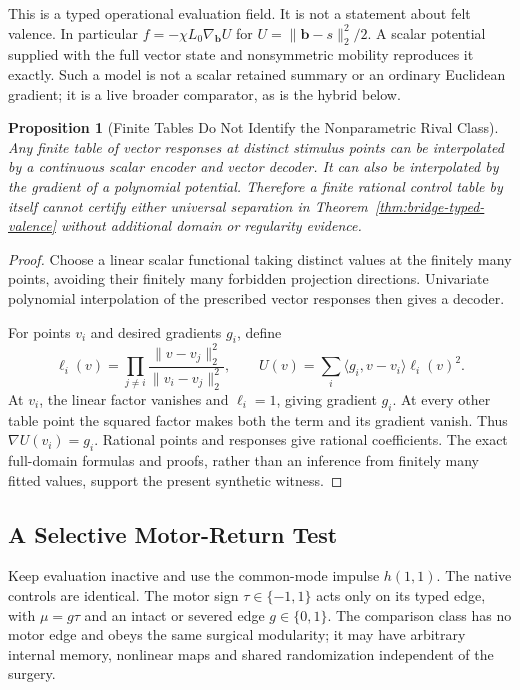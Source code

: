 \documentclass[11pt,a4paper]{article}
\newtheorem{proposition}[theorem]{Proposition}
\theoremstyle{definition}
\begin{document}
This is a typed operational evaluation field. It is not a statement about felt valence. In particular $f=-\chi L_0\nabla_{\mathbf b}U$ for $U=\|\mathbf b-s\|_2^2/2$. A scalar potential supplied with the full vector state and nonsymmetric mobility reproduces it exactly. Such a model is not a scalar retained summary or an ordinary Euclidean gradient; it is a live broader comparator, as is the hybrid below.

\begin{proposition}[Finite Tables Do Not Identify the Nonparametric Rival Class]\label{prop:bridge-finite-table-obstruction}
Any finite table of vector responses at distinct stimulus points can be interpolated by a continuous scalar encoder and vector decoder. It can also be interpolated by the gradient of a polynomial potential. Therefore a finite rational control table by itself cannot certify either universal separation in Theorem~\ref{thm:bridge-typed-valence} without additional domain or regularity evidence.
\end{proposition}
\begin{proof}
Choose a linear scalar functional taking distinct values at the finitely many points, avoiding their finitely many forbidden projection directions. Univariate polynomial interpolation of the prescribed vector responses then gives a decoder.

For points $v_i$ and desired gradients $g_i$, define
\[
 \ell_i(v)=\prod_{j\ne i}\frac{\|v-v_j\|_2^2}{\|v_i-v_j\|_2^2},\qquad
 U(v)=\sum_i \langle g_i,v-v_i\rangle\ell_i(v)^2.
\]
At $v_i$, the linear factor vanishes and $\ell_i=1$, giving gradient $g_i$. At every other table point the squared factor makes both the term and its gradient vanish. Thus $\nabla U(v_i)=g_i$. Rational points and responses give rational coefficients. The exact full-domain formulas and proofs, rather than an inference from finitely many fitted values, support the present synthetic witness.
\end{proof}

\subsection{A Selective Motor-Return Test}

Keep evaluation inactive and use the common-mode impulse $h(1,1)$. The native controls are identical. The motor sign $\tau\in\{-1,1\}$ acts only on its typed edge, with $\mu=g\tau$ and an intact or severed edge $g\in\{0,1\}$. The comparison class has no motor edge and obeys the same surgical modularity; it may have arbitrary internal memory, nonlinear maps and shared randomization independent of the surgery.
\end{document}
